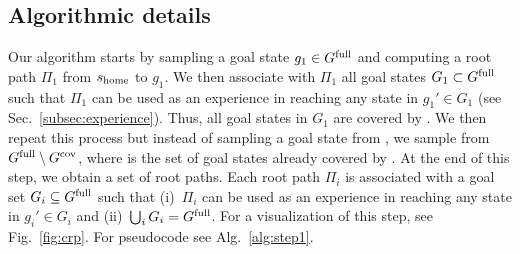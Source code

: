 \documentclass[conference]{IEEEtran}
\begin{document}
\subsection{Algorithmic details}
Our algorithm starts by sampling a goal state $g_1 \in G^{\textrm{full}}$ and computing a root path $\Pi_1$ from $s_{\textrm{home}}$ to $g_1$. We then associate with $\Pi_1$ all goal states $G_1 \subset G^{\textrm{full}}$ such that $\Pi_1$ can be used as an experience in reaching any state in $g_1' \in G_1$ (see Sec.~\ref{subsec:experience}).
Thus, all goal states in $G_1$ are covered by \Shome.
%
We then repeat this process but instead of sampling  a goal state from \Gfull, we sample from $G^{\textrm{full}} \setminus G^{\textrm{cov}}$, where \Gcov is the set of goal states already covered by \Shome.
At the end of this step, we obtain a set of root paths. 
Each root path $\Pi_i$ is associated with a goal set $G_i \subseteq G^{\textrm{full}}$ such that 
(i)~$\Pi_i$ can be used as an experience in reaching any state in $g_i' \in G_i$ and 
(ii)~$\bigcup_i G_i = G^{\textrm{full}}$.
%
For a visualization of this step, see Fig.~\ref{fig:crp}.
For pseudocode see Alg.~\ref{alg:step1}.
\end{document}
